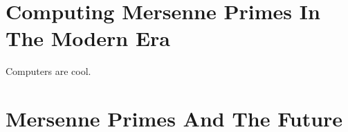 \section{Computing Mersenne Primes In The Modern Era}
Computers are cool.
\section{Mersenne Primes And The Future}
